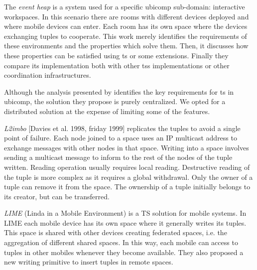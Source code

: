 The \emph{event heap} \citep{johanson_extending_2004} is a system used for a specific \ac{ubicomp} sub-domain: interactive workspaces.
In this scenario there are rooms with different devices deployed and where mobile devices can enter.
Each room has its own space where the devices exchanging tuples to cooperate.
This work merely identifies the requirements of these environments and the properties which solve them.
Then, it discusses how these properties can be satisfied using \ac{ts} or some extensions.
Finally they compare its implementation both with other \acp{ts} implementations or other coordination infrastructures. %

Although the analysis presented by \citeauthor{johanson_extending_2004} identifies the key requirements for \ac{ts} in \ac{ubicomp},
the solution they propose is purely centralized.
We opted for a distributed solution at the expense of limiting some of the features.


\emph{L2imbo} [Davies et al. 1998, friday 1999] replicates the tuples to avoid a single point of failure. %
Each node joined to a space uses an IP multicast address to exchange messages with other nodes in that space.
Writing into a space involves sending a multicast message to inform to the rest of the nodes of the tuple written.
Reading operation usually requires local reading.
Destructive reading of the tuple is more complex as it requires a global withdrawal.
Only the owner of a tuple can remove it from the space.
The ownership of a tuple initially belongs to its creator, but can be transferred. %


\emph{LIME} (Linda in a Mobile Environment) \citep{picco_lime:_1999} is a TS solution for mobile systems.
In LIME each mobile device has its own space where it generally writes its tuples.
This space is shared with other devices creating federated spaces, i.e. the aggregation of different shared spaces.
In this way, each mobile can access to tuples in other mobiles whenever they become available.
They also proposed a new writing primitive to insert tuples in remote spaces.

